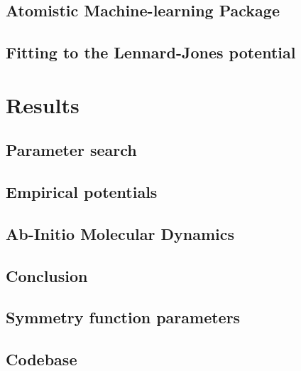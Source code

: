 \documentclass[12pt]{report}
\begin{document}
\chapter{Atomistic Machine-learning Package}


\chapter{Fitting to the Lennard-Jones potential}


\part{Results}

\chapter{Parameter search}


\chapter{Empirical potentials}


\chapter{Ab-Initio Molecular Dynamics}


\chapter{Conclusion}


\begin{appendices}

\chapter{Symmetry function parameters}

\chapter{Codebase}

\end{appendices}

\printbibliography
\end{document}
